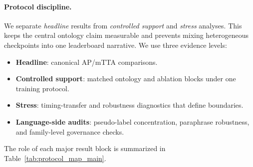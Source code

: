 \paragraph{Protocol discipline.}
We separate \emph{headline} results from \emph{controlled support} and
\emph{stress} analyses. This keeps the central ontology claim measurable and
prevents mixing heterogeneous checkpoints into one leaderboard narrative. We
use three evidence levels:
\begin{itemize}
  \item \textbf{Headline}: canonical AP/mTTA comparisons.
  \item \textbf{Controlled support}: matched ontology and ablation blocks under one training protocol.
  \item \textbf{Stress}: timing-transfer and robustness diagnostics that define boundaries.
  \item \textbf{Language-side audits}: pseudo-label concentration, paraphrase
    robustness, and family-level governance checks.
\end{itemize}
The role of each major result block is summarized in
Table~\ref{tab:protocol_map_main}.
\begin{table}[t]
\caption{Protocol and evidence map for the main paper. It separates headline prediction
from controlled support blocks so the table is not mistaken for one pooled leaderboard.}
\label{tab:protocol_map_main}
\centering\scriptsize
\TableStyleOn
\setlength{\tabcolsep}{2.5pt}
\TableStyleOff
\end{table}
